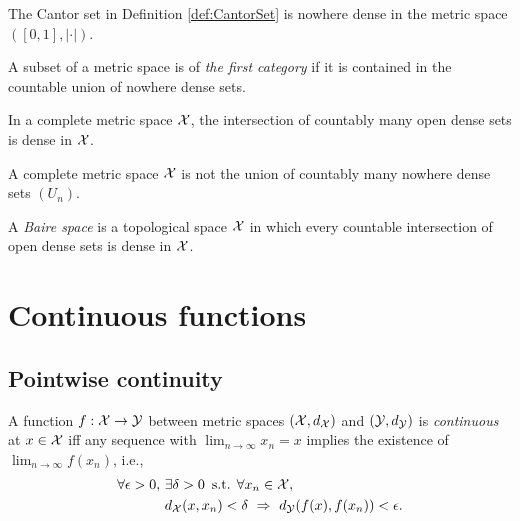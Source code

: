 \begin{exm}
  The Cantor set in Definition \ref{def:CantorSet}
  is nowhere dense in the metric space $([0,1],|\cdot|)$.
\end{exm}

\begin{defn}
  \label{def:metricSpaceFirstCat}
  A subset of a metric space is of \emph{the first category}
  if it is contained in the countable union of nowhere dense sets.
\end{defn}

\begin{thm}
  \label{thm:BaireCat}
  In a complete metric space ${\cal X}$,
  the intersection of countably many open dense sets is dense in ${\cal X}$.
\end{thm}

\begin{coro}
  \label{coro:BaireCat}
  A complete metric space ${\cal X}$ is 
  not the union of countably many nowhere dense sets $(U_n)$.
\end{coro}

\begin{defn}
  A \emph{Baire space} is a topological space ${\cal X}$
  in which every countable intersection of open dense sets
  is dense in ${\cal X}$.
\end{defn}

\section{Continuous functions}
\label{sec:continuous-functions-metricSpaces}

\subsection{Pointwise continuity}
\label{sec:pointwise-continuity}

\begin{defn}
  \label{def:continuousFuncPointMetricSpace}
  A function $f: {\cal X} \rightarrow {\cal Y}$
  between metric spaces $({\cal X},d_{\cal X})$
  and $({\cal Y}, d_{\cal Y})$
  is \emph{continuous} at $x\in{\cal X}$ iff 
  any sequence with $\lim_{n\rightarrow \infty}x_n = x$
  implies the existence of $\lim_{n\rightarrow \infty}f(x_n)$, 
  i.e., 
  \begin{align}
    \label{eq:continuousFuncPointMetricSpace}
    \forall \epsilon>0,\ &\exists \delta>0\, \text{ s.t. }
    \forall x_n \in {\cal X}, \ \
    \\ \nonumber
                         &d_{\cal X}(x,x_n)<\delta\ \Rightarrow\
                           d_{\cal Y}(f(x),f(x_n))<\epsilon. 
  \end{align}
\end{defn}

